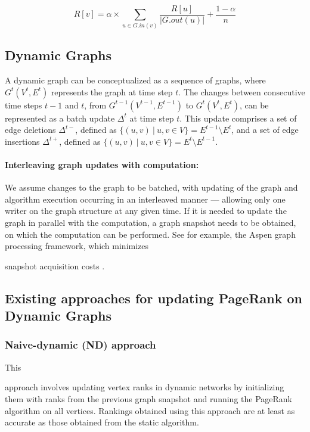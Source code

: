 \begin{equation}
\label{eq:pr}
    R[v] = \alpha \times \sum_{u \in G.in(v)} \frac{R[u]}{|G.out(u)|} + \frac{1 - \alpha}{n}
\end{equation}




\subsection{Dynamic Graphs}
\label{sec:about-dynamic}

A dynamic graph can be conceptualized as a sequence of graphs, where $G^t(V^t, E^t)$ represents the graph at time step $t$. The changes between consecutive time steps $t-1$ and $t$, from $G^{t-1}(V^{t-1}, E^{t-1})$ to $G^t(V^t, E^t)$, can be represented as a batch update $\Delta^t$ at time step $t$. This update comprises a set of edge deletions $\Delta^{t-}$, defined as $\{(u, v)\ |\ u, v \in V\} = E^{t-1} \setminus E^t$, and a set of edge insertions $\Delta^{t+}$, defined as $\{(u, v)\ |\ u, v \in V\} = E^t \setminus E^{t-1}$.


\paragraph{Interleaving graph updates with computation:}

We assume changes to the graph to be batched, with updating of the graph and algorithm execution occurring in an interleaved manner --- allowing only one writer on the graph structure at any given time. If it is needed to update the graph in parallel with the computation, a graph snapshot needs to be obtained, on which the computation can be performed. See for example, the Aspen graph processing framework, which minimizes snapshot acquisition costs \cite{graph-dhulipala19}.




\subsection{Existing approaches for updating PageRank on Dynamic Graphs}

\subsubsection{Naive-dynamic (ND) approach}
\label{sec:about-naive}

This approach involves updating vertex ranks in dynamic networks by initializing them with ranks from the previous graph snapshot and running the PageRank algorithm on all vertices. Rankings obtained using this approach are at least as accurate as those obtained from the static algorithm.


